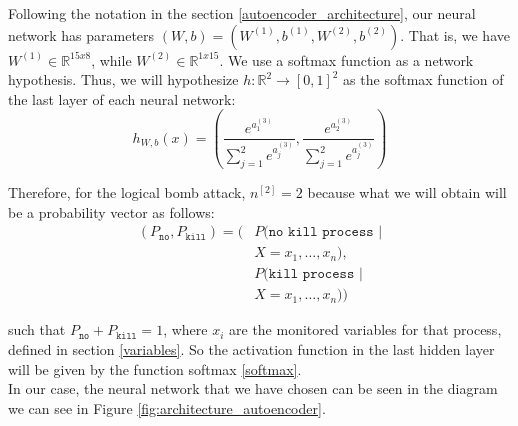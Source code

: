 \documentclass{iosart2c}
\begin{document}
Following the notation in the section \ref{autoencoder_architecture}, our neural network has parameters $(W,b)=(W^{(1)},b^{(1)},W^{(2)},b^{(2)})$. That is, we have $W^{(1)} \in \mathbb {R}^{15x8}$, while $ W^{(2)} \in \mathbb {R}^{1x15}$. We use a softmax function as a network hypothesis. Thus, we will hypothesize $ h: \mathbb {R}^ {2} \rightarrow [0,1] ^ 2 $ as the softmax function of the last layer of each neural network: 
\begin{equation}\label{softmax}
h_{W,b}(x)=\left(\frac{e^{a_1^{(3)}}}{\sum_{j=1}^2 e^{a_j^{(3)}}},\frac{e^{a_2^{(3)}}}{\sum_{j=1}^2 e^{a_j^{(3)}}}\right)
\end{equation}


Therefore, for the logical bomb attack, $n^{[2]}=2$ because what we will obtain will be a probability vector as follows:
\begin{align*}
    (P_{\texttt{no}},P_{\texttt{kill}})=(&P(\texttt{no kill process } | \\
									    & X=x_1,\ldots,x_n),\\
                                         &P(\texttt{kill process } | \\
                                         & X=x_1,\ldots,x_n))
\end{align*}

such that  $P_{\texttt{no}}+P_{\texttt{kill}}=1$, where $x_i$ are the monitored variables for that process, defined in section \ref{variables}. So the activation function in the last hidden layer will be given by the function softmax \ref{softmax}. \\

In our case, the neural network that we have chosen can be seen in the diagram we can see in Figure \ref{fig:architecture_autoencoder}.\\
\end{document}
